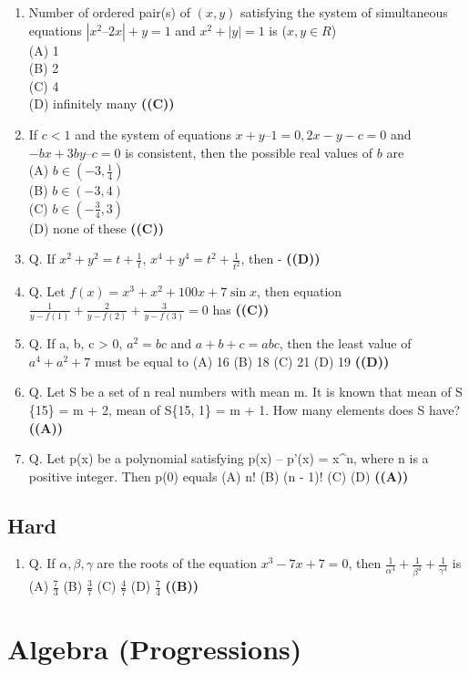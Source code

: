 \documentclass{article}
\begin{document}
\begin{enumerate}
(A) 18
(B) 15
(C) 10
(D) 36 \hfill \textbf{((A))}
\item Number of ordered pair(s) of $(x, y)$ satisfying the system of simultaneous equations $|x^2 – 2x| + y = 1$ and $x^2 + |y| = 1$ is ($x, y \in R$)\\
(A) 1\\
(B) 2\\
(C) 4\\
(D) infinitely many \hfill \textbf{((C))}
\item If $c < 1$ and the system of equations $x + y – 1 = 0, 2x - y - c = 0$ and $-bx + 3by – c = 0$ is consistent, then the possible real values of $b$ are\\
(A) $b\in (-3,\frac{1}{4})$\\
(B) $b\in (-3,4)$\\
(C) $b\in (-\frac{3}{4},3)$\\
(D) none of these \hfill \textbf{((C))}
\item Q. If $x^2 + y^2 = t + \frac{1}{t}$, $x^4 + y^4 = t^2 + \frac{1}{t^2}$, then - \hfill \textbf{((D))}
\item Q. Let $f(x) = x^3 + x^2 + 100x + 7 \sin x$, then equation $\frac{1}{y-f(1)} + \frac{2}{y-f(2)} + \frac{3}{y-f(3)} = 0$ has \hfill \textbf{((C))}
\item Q. If a, b, c > 0, $a^2 = bc$ and $a + b + c = abc$, then the least value of $a^4 + a^2 + 7$ must be equal to
(A) 16
(B) 18
(C) 21
(D) 19 \hfill \textbf{((D))}
\item Q. Let S be a set of n real numbers with mean m. It is known that mean of S \cup \{15\} = m + 2, mean of S\cup \{15, 1\} = m + 1. How many elements does S have? \hfill \textbf{((A))}
\item Q. Let p(x) be a polynomial satisfying
p(x) – p'(x) = x^n,
where n is a positive integer. Then p(0) equals
(A) n!
(B) (n - 1)!
(C) 
(D)  \hfill \textbf{((A))}
\end{enumerate}
\subsection{Hard}
\begin{enumerate}
\item Q. If $\alpha, \beta, \gamma$ are the roots of the equation $x^3 - 7x + 7 = 0$, then $\frac{1}{\alpha^4} + \frac{1}{\beta^4} + \frac{1}{\gamma^4}$ is
(A) $\frac{7}{3}$
(B) $\frac{3}{7}$
(C) $\frac{4}{7}$
(D) $\frac{7}{4}$ \hfill \textbf{((B))}
\end{enumerate}
\section{Algebra (Progressions)}
\end{document}
